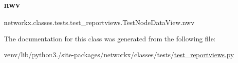 \subsubsection{\texorpdfstring{nwv}{nwv}}
{\footnotesize\ttfamily networkx.\+classes.\+tests.\+test\+\_\+reportviews.\+Test\+Node\+Data\+View.\+nwv}



The documentation for this class was generated from the following file\+:\begin{DoxyCompactItemize}
\item 
venv/lib/python3./site-\/packages/networkx/classes/tests/\hyperlink{test__reportviews_8py}{test\+\_\+reportviews.\+py}\end{DoxyCompactItemize}

